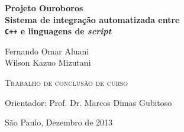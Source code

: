 \documentclass[11pt,twoside,a4paper]{book}
\begin{document}
\frontmatter 
\fancyhead[RO]{{\footnotesize\rightmark}\hspace{2em}\thepage}
\setcounter{tocdepth}{2}
\fancyhead[LE]{\thepage\hspace{2em}\footnotesize{\leftmark}}
\fancyhead[RE,LO]{}
\fancyhead[RO]{{\footnotesize\rightmark}\hspace{2em}\thepage}

\onehalfspacing  %

\thispagestyle{empty}
\begin{center}
  \vspace*{2.3cm}
  \textsf{\textbf{
    {\LARGE Projeto Ouroboros }\\
    {
      \Large Sistema de integração automatizada entre \\
      \texttt{C++} e linguagens de \emph{script}
    }
  }}
    
  \vspace*{1.2cm}
  \textsf{\Large{Fernando Omar Aluani}} \\
  \textsf{\Large{Wilson Kazuo Mizutani}}
  
  \vskip 2cm
  \textsc{Trabalho de conclusão de curso} 
  
  \vskip 10cm
  \textsf{Orientador: Prof. Dr. Marcos Dimas Gubitoso}

  \vskip 3cm
  
  \normalsize{São Paulo, Dezembro de 2013}
\end{center}



\renewcommand{\ttdefault}{txtt}
\def\cyclic#1{\langle #1 \rangle}
\def\script{\emph{script}}
\def\lang#1{\texttt{#1}}
\def\CXX{\lang{C++}}
\def\C{\lang{C}}
\def\VObj{\lang{VirtualObj}}
\def\SMgr{\lang{ScriptManager}}
\def\VMac{\lang{VirtualMachine}}
\def\VData{\lang{VirtualData}}
\def\str#1{cadeia#1 de caracteres}

\newcommand\definicao[1]{
    \stepcounter{defcnt}
    \begin{framed}
      \textbf{Definição \thechapter.\thedefcnt:}

      \vspace{.5em}
      \hspace{-20pt}
      #1
    \end{framed}
}
\newcommand\notacao{
    \textbf{Notação} \hspace{0.2cm}
}
\end{document}
